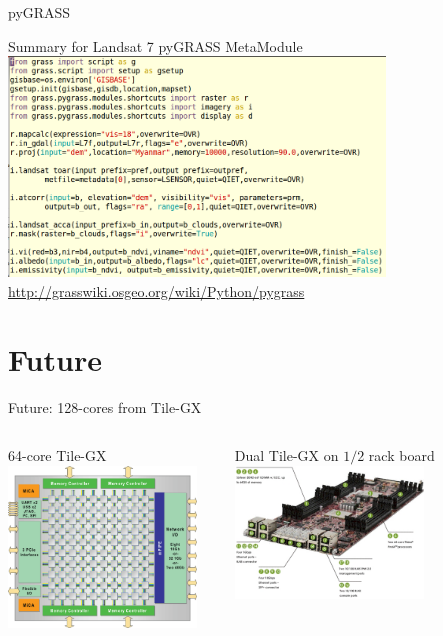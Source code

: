 \documentclass[xcolor=dvipsnames,beamer]{beamer} %
\begin{document}
\begin{frame}[fragile]{pyGRASS}

\begin{center}
 Summary for Landsat 7 pyGRASS MetaModule
 \includegraphics[width=10cm]{pyGRASS1}\\
 \href{http://grasswiki.osgeo.org/wiki/Python/pygrass}{http://grasswiki.osgeo.org/wiki/Python/pygrass}
\end{center}

\end{frame}

\section{Future}
\begin{frame}[fragile]{Future: 128-cores from Tile-GX}

\begin{columns}[l]
\begin{center}
 64-core Tile-GX\newline\linebreak
 \includegraphics[width=5cm]{TILE-Gx_Block_Diagram_large}
\end{center}
\begin{center}
 Dual Tile-GX on {\small $1/2$} rack board\newline\linebreak
 \includegraphics[width=5cm]{tilera_quanta_sq2_mobo}
\end{center}

\end{columns}

\end{frame}
\end{document}
